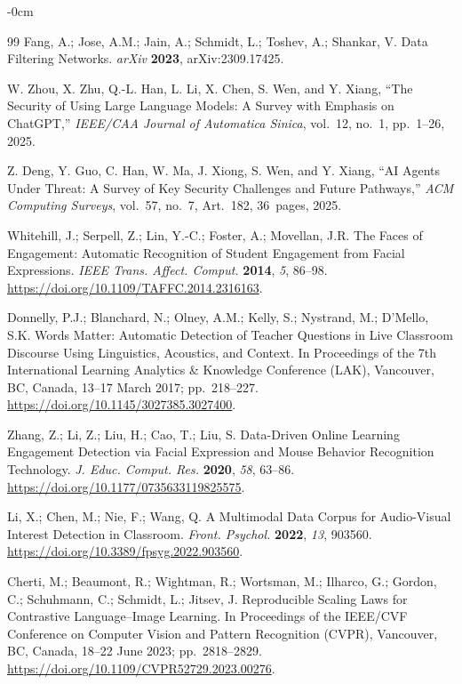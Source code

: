 \documentclass[symmetry,article,submit,pdftex,moreauthors]{Definitions/mdpi}
\begin{document}
\begin{adjustwidth}{-\extralength}{0cm}
\begin{thebibliography}{99}
Fang, A.; Jose, A.M.; Jain, A.; Schmidt, L.; Toshev, A.; Shankar, V.
Data Filtering Networks.
\textit{arXiv} \textbf{2023}, arXiv:2309.17425.

W. Zhou, X. Zhu, Q.-L. Han, L. Li, X. Chen, S. Wen, and Y. Xiang,
``The Security of Using Large Language Models: A Survey with Emphasis on ChatGPT,''
\emph{IEEE/CAA Journal of Automatica Sinica}, vol.~12, no.~1, pp.~1--26, 2025.

Z. Deng, Y. Guo, C. Han, W. Ma, J. Xiong, S. Wen, and Y. Xiang,
``AI Agents Under Threat: A Survey of Key Security Challenges and Future Pathways,''
\emph{ACM Computing Surveys}, vol.~57, no.~7, Art.~182, 36~pages, 2025.

Whitehill, J.; Serpell, Z.; Lin, Y.-C.; Foster, A.; Movellan, J.R.
The Faces of Engagement: Automatic Recognition of Student Engagement from Facial Expressions.
\textit{IEEE Trans. Affect. Comput.} \textbf{2014}, \textit{5}, 86--98. \url{https://doi.org/10.1109/TAFFC.2014.2316163}.

Donnelly, P.J.; Blanchard, N.; Olney, A.M.; Kelly, S.; Nystrand, M.; D'Mello, S.K.
Words Matter: Automatic Detection of Teacher Questions in Live Classroom Discourse Using Linguistics, Acoustics, and Context.
In Proceedings of the 7th International Learning Analytics \& Knowledge Conference (LAK), Vancouver, BC, Canada, 13--17 March 2017; pp.~218--227. \url{https://doi.org/10.1145/3027385.3027400}.

Zhang, Z.; Li, Z.; Liu, H.; Cao, T.; Liu, S.
Data-Driven Online Learning Engagement Detection via Facial Expression and Mouse Behavior Recognition Technology.
\textit{J. Educ. Comput. Res.} \textbf{2020}, \textit{58}, 63--86. \url{https://doi.org/10.1177/0735633119825575}.

Li, X.; Chen, M.; Nie, F.; Wang, Q.
A Multimodal Data Corpus for Audio-Visual Interest Detection in Classroom.
\textit{Front. Psychol.} \textbf{2022}, \textit{13}, 903560. \url{https://doi.org/10.3389/fpsyg.2022.903560}.

Cherti, M.; Beaumont, R.; Wightman, R.; Wortsman, M.; Ilharco, G.; Gordon, C.; Schuhmann, C.; Schmidt, L.; Jitsev, J.
Reproducible Scaling Laws for Contrastive Language--Image Learning.
In Proceedings of the IEEE/CVF Conference on Computer Vision and Pattern Recognition (CVPR), Vancouver, BC, Canada, 18--22 June 2023; pp.~2818--2829. \url{https://doi.org/10.1109/CVPR52729.2023.00276}.


\end{thebibliography}
\end{adjustwidth}
\end{document}
